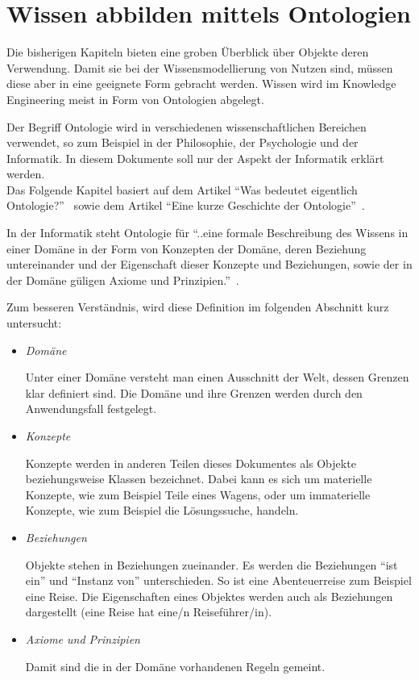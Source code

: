 \chapter{Wissen abbilden mittels Ontologien}
\label{chap:ontologien}

Die bisherigen Kapiteln bieten eine groben Überblick über Objekte deren Verwendung. Damit sie bei der Wissensmodellierung von Nutzen sind, müssen diese aber in eine geeignete Form gebracht werden. Wissen wird im Knowledge Engineering meist in Form von Ontologien abgelegt.

Der Begriff Ontologie wird in verschiedenen wissenschaftlichen Bereichen verwendet, so zum Beispiel in der Philosophie, der Psychologie und der Informatik. In diesem Dokumente soll nur der Aspekt der Informatik erklärt werden. \\
Das Folgende Kapitel basiert auf dem Artikel ``Was bedeutet eigentlich Ontologie?''~\cite{IspekOntoBedeutung} sowie dem Artikel ``Eine kurze Geschichte der Ontologie''~\cite{ISpekOntoGeschichte}.

In der Informatik steht Ontologie für ``..eine formale Beschreibung des Wissens in einer Domäne in der Form von Konzepten der Domäne, deren Beziehung untereinander und der Eigenschaft dieser Konzepte und Beziehungen, sowie der in der Domäne güligen Axiome und Prinzipien.''~\cite[S.310]{ISpekOntoGeschichte}.

Zum besseren Verständnis, wird diese Definition im folgenden Abschnitt kurz untersucht:
\begin{itemize}
    \item \textit{Domäne}

        Unter einer Domäne versteht man einen Ausschnitt der Welt, dessen Grenzen klar definiert sind. Die Domäne und ihre Grenzen werden durch den Anwendungsfall festgelegt.

    \item \textit{Konzepte}

        Konzepte werden in anderen Teilen dieses Dokumentes als Objekte beziehungsweise Klassen bezeichnet. Dabei kann es sich um materielle Konzepte, wie zum Beispiel Teile eines Wagens, oder um immaterielle Konzepte, wie zum Beispiel die Lösungssuche, handeln.

    \item \textit{Beziehungen}

        Objekte stehen in Beziehungen zueinander. Es werden die Beziehungen ``ist ein'' und ``Instanz von'' unterschieden. So ist eine Abenteuerreise zum Beispiel eine Reise. Die Eigenschaften eines Objektes werden auch als Beziehungen dargestellt (eine Reise hat eine/n Reiseführer/in).

    \item \textit{Axiome und Prinzipien}

        Damit sind die in der Domäne vorhandenen Regeln gemeint.
\end{itemize}

